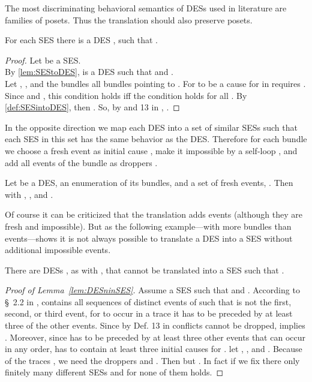\documentclass[runningheads,a4paper]{llncs}
\begin{document}
The most discriminating behavioral semantics of DESs used in literature are
families of posets. Thus the translation should also preserve posets.

\begin{theorem}
	\label{thm:SESintoDES}
	For each SES  there is a DES , such that .
\end{theorem}

\begin{proof}
	Let  be a SES.\\
	By \lem\ref{lem:SEStoDES},  is a DES such that  and .\\
	Let , , and the bundles  all bundles pointing to . For  to be a cause for   in \cite{dynamicCausality15} requires . Since  and , this condition holds iff the condition  holds for all .
	By \ref{def:SESintoDES}, then .
	So, by  and 13 in \cite{dynamicCausality15}, .
\end{proof}

In the opposite direction we map each DES into a set of similar SESs such that each SES in this set has the same behavior as the DES. Therefore for each bundle  we choose a fresh event  as initial cause , make it impossible by a self-loop , and add all events  of the bundle  as droppers .

\begin{definition}
	\label{def:DESintoSES}
	Let  be a DES,  an enumeration of its bundles, and  a set of fresh events, \ie .
	Then  with , , and .
\end{definition}

Of course it can be criticized that the translation adds events (although they are fresh and impossible). But as the following example---with more bundles than events---shows it is not always possible to translate a DES into a SES without additional impossible events.

\begin{lemma}
	\label{lem:DESninSES}
	There are DESs , as \eg  with ,
	that cannot be translated into a SES  such that .
\end{lemma}

\begin{proof}[Proof of Lemma~\ref{lem:DESninSES}]
	Assume a SES  such that   and .
	According to \S~2.2 in \cite{dynamicCausality15},  contains all
	sequences of distinct events of  such that  is not the first, second, or third event, \ie for  to occur in a trace it has to be preceded by at least three of the other events.
	Since by Def. 13 in \cite{dynamicCausality15} conflicts cannot be dropped,  implies .
	Moreover, since  has to be preceded by at least three other events that can occur in any order,  has to contain at least three initial causes for . \WLOG let , , and .
	Because of the traces , we need the droppers  and . Then  but .
	In fact if we fix  there only finitely many different SESs  and for none of them  holds.
\end{proof}
\end{document}
